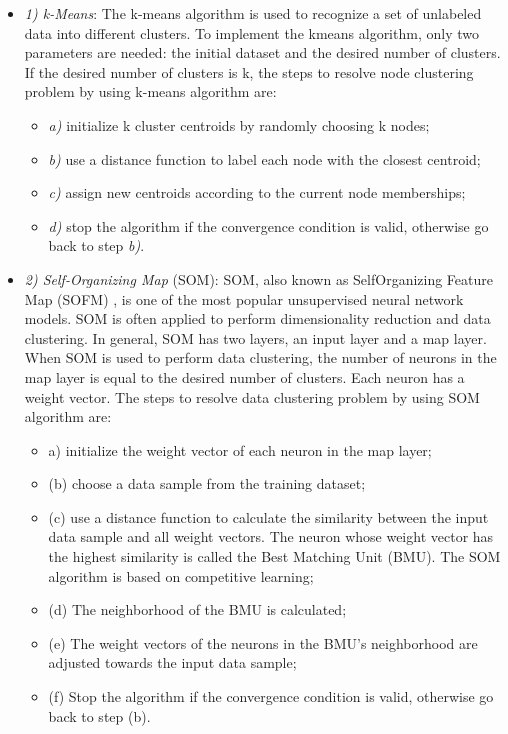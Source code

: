 \begin{itemize}
\begin{itemize}
\item[]\textit{1)	k-Means}: The k-means algorithm is used to recognize a set of unlabeled data into different clusters. To implement the kmeans algorithm, only two parameters are needed: the initial dataset and the desired number of clusters. If the desired number of clusters is k, the steps to resolve node clustering problem by using k-means algorithm are:
\begin{itemize}
\item[]\textit{a)} initialize k cluster centroids by randomly choosing k nodes;
\item[]\textit{b)} use a distance function to label each node with the closest centroid;
\item[]\textit{c)} assign new centroids according to the current node memberships;
\item[]\textit{d)} stop the algorithm if the convergence condition is valid, otherwise go back to step \textit{b)}.
\end{itemize}
\item[]\textit{2)	Self-Organizing Map} (SOM): SOM, also known as SelfOrganizing Feature Map (SOFM) \cite{Kohonen2012}, is one of the most popular unsupervised neural network models. SOM is often applied to perform dimensionality reduction and data clustering. In general, SOM has two layers, an input layer and a map layer. When SOM is used to perform data clustering, the number of neurons in the map layer is equal to the desired number of clusters. Each neuron has a weight vector. The steps to resolve data clustering problem by using SOM algorithm are:
\begin{itemize}
\item[]a) initialize the weight vector of each neuron in the map layer;
\item[](b) choose a data sample from the training dataset;
\item[](c) use a distance function to calculate the similarity between the input data sample and all weight vectors. The neuron whose weight vector has the highest similarity is called the Best Matching Unit (BMU). The SOM algorithm is based on competitive learning;
\item[](d) The neighborhood of the BMU is calculated;
\item[](e) The weight vectors of the neurons in the BMU’s neighborhood are adjusted towards the input data sample;
\item[](f) Stop the algorithm if the convergence condition is valid, otherwise go back to step (b).

\end{itemize}
\end{itemize}
\end{itemize}

